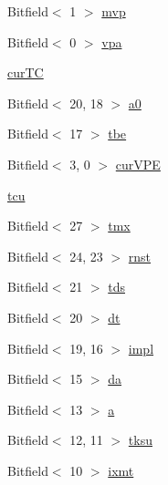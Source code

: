 \begin{DoxyCompactItemize}
\item 
Bitfield$<$ 1 $>$ \hyperlink{namespaceMipsISA_aa9e0fc4e00b6e017d9ebf3034a3c058b}{mvp}
\item 
Bitfield$<$ 0 $>$ \hyperlink{namespaceMipsISA_afeada43f172af66e3070955f6fbdae0f}{vpa}
\item 
\hyperlink{namespaceMipsISA_a6a7cd3162cee0aaeab46e183deba4570}{curTC}
\item 
Bitfield$<$ 20, 18 $>$ \hyperlink{namespaceMipsISA_a12f761936cfc5ebfa95023b681c197ea}{a0}
\item 
Bitfield$<$ 17 $>$ \hyperlink{namespaceMipsISA_add877431a7c8275bb70e703af62126cd}{tbe}
\item 
Bitfield$<$ 3, 0 $>$ \hyperlink{namespaceMipsISA_af664735d8c00dc46e5872615d7ed1586}{curVPE}
\item 
\hyperlink{namespaceMipsISA_acf48196c624fe6542be509d565aaa99c}{tcu}
\item 
Bitfield$<$ 27 $>$ \hyperlink{namespaceMipsISA_a366e78a0dd88a5f2232e7a28257faae7}{tmx}
\item 
Bitfield$<$ 24, 23 $>$ \hyperlink{namespaceMipsISA_a6e1658c107856e035b6bc91e7f70ef37}{rnst}
\item 
Bitfield$<$ 21 $>$ \hyperlink{namespaceMipsISA_a578ea2452799b48b7f2340239a441b9c}{tds}
\item 
Bitfield$<$ 20 $>$ \hyperlink{namespaceMipsISA_a5543f80125ece4166f92d57587fae732}{dt}
\item 
Bitfield$<$ 19, 16 $>$ \hyperlink{namespaceMipsISA_affa7ef712ce627284efec135c68cc4da}{impl}
\item 
Bitfield$<$ 15 $>$ \hyperlink{namespaceMipsISA_a16b0e70465cd99b83e007456f47749f3}{da}
\item 
Bitfield$<$ 13 $>$ \hyperlink{namespaceMipsISA_ad15ace88a723e43c4e98c8c646891e79}{a}
\item 
Bitfield$<$ 12, 11 $>$ \hyperlink{namespaceMipsISA_ace7dbda8c56b939e4085ad627663f437}{tksu}
\item 
Bitfield$<$ 10 $>$ \hyperlink{namespaceMipsISA_a04bf8b2bd70c723a77a103df4740f04f}{ixmt}
\end{DoxyCompactItemize}
